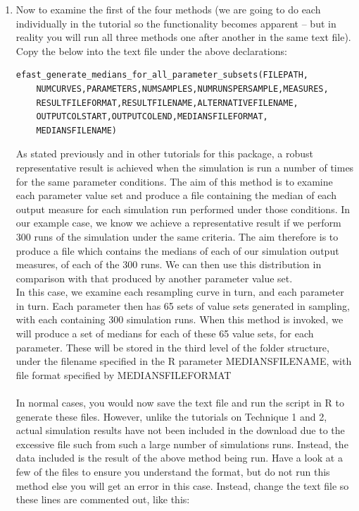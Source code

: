 \documentclass[a4paper,11pt]{article}
\begin{document}
\begin{enumerate}
\begin{verbatim}
\end{verbatim}

\item Now to examine the first of the four methods (we are going to do each individually in the tutorial so the functionality becomes apparent – but in reality you will run all three methods one after another in the same text file). Copy the below into the text file under the above declarations:

\begin{verbatim}
efast_generate_medians_for_all_parameter_subsets(FILEPATH,
	NUMCURVES,PARAMETERS,NUMSAMPLES,NUMRUNSPERSAMPLE,MEASURES,
	RESULTFILEFORMAT,RESULTFILENAME,ALTERNATIVEFILENAME,
	OUTPUTCOLSTART,OUTPUTCOLEND,MEDIANSFILEFORMAT,
	MEDIANSFILENAME)
\end{verbatim}

As stated previously and in other tutorials for this package, a robust representative result is achieved when the simulation is run a number of times for the same parameter conditions. The aim of this method is to examine each parameter value set and produce a file containing the median of each output measure for each simulation run performed under those conditions. In our example case, we know we achieve a representative result if we perform 300 runs of the simulation under the same criteria. The aim therefore is to produce a file which contains the medians of each of our simulation output measures, of each of the 300 runs. We can then use this distribution in comparison with that produced by another parameter value set.
\\
In this case, we examine each resampling curve in turn, and each parameter in turn. Each parameter then has 65 sets of value sets generated in sampling, with each containing 300 simulation runs. When this method is invoked, we will produce a set of medians for each of these 65 value sets, for each parameter. These will be stored in the third level of the folder structure, under the filename specified in the R parameter MEDIANSFILENAME, with file format specified by MEDIANSFILEFORMAT\\
\\
In normal cases, you would now save the text file and run the script in R to generate these files. However, unlike the tutorials on Technique 1 and 2, actual simulation results have not been included in the download due to the excessive file such from such a large number of simulations runs. Instead, the data included is the result of the above method being run. Have a look at a few of the files to ensure you understand the format, but do not run this method else you will get an error in this case.  Instead, change the text file so these lines are commented out, like this:


\end{enumerate}
\end{document}

